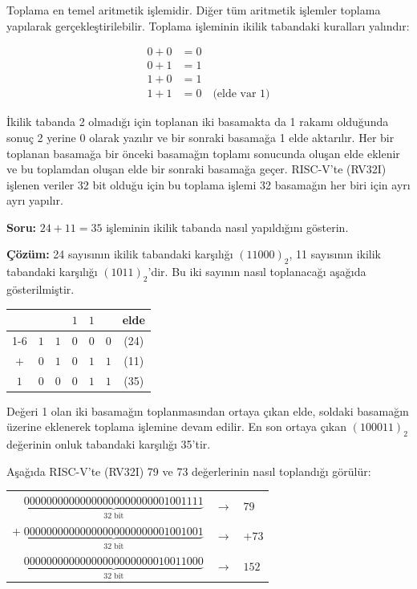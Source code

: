 Toplama en temel aritmetik işlemidir. Diğer tüm aritmetik işlemler toplama yapılarak gerçekleştirilebilir. Toplama işleminin ikilik tabandaki kuralları yalındır:

\begin{align*}
0 + 0 &= 0 \\
0 + 1 &= 1 \\
1 + 0 &= 1 \\
1 + 1 &= 0 \quad \text{(elde var 1)}
\end{align*}

İkilik tabanda 2 olmadığı için toplanan iki basamakta da 1 rakamı olduğunda sonuç 2 yerine 0 olarak yazılır ve bir sonraki basamağa 1 elde aktarılır. Her bir toplanan basamağa bir önceki basamağın toplamı sonucunda oluşan elde eklenir ve bu toplamdan oluşan elde bir sonraki basamağa geçer. RISC-V'te (RV32I) işlenen veriler 32 bit olduğu için bu toplama işlemi 32 basamağın her biri için ayrı ayrı yapılır.

\begin{ornek}[5.1]
\textbf{Soru:} $24 + 11 = 35$ işleminin ikilik tabanda nasıl yapıldığını gösterin.

\textbf{Çözüm:} 24 sayısının ikilik tabandaki karşılığı $(11000)_2$, 11 sayısının ikilik tabandaki karşılığı $(1011)_2$'dir. Bu iki sayının nasıl toplanacağı aşağıda gösterilmiştir.

\begin{center}
\begin{tabular}{c c c c c c c}
  & &   & $1$ & $1$ & & elde \\
\cline{1-6}
  & $1$ & $1$ & $0$ & $0$ & $0$ & (24) \\
$+$ & $0$ & $1$ & $0$ & $1$ & $1$ & (11) \\
\hline
$1$ & $0$ & $0$ & $0$ & $1$ & $1$ & (35) \\
\end{tabular}
\end{center}

Değeri 1 olan iki basamağın toplanmasından ortaya çıkan elde, soldaki basamağın üzerine eklenerek toplama işlemine devam edilir. En son ortaya çıkan $(100011)_2$ değerinin onluk tabandaki karşılığı 35'tir.
\end{ornek}

Aşağıda RISC-V'te (RV32I) 79 ve 73 değerlerinin nasıl toplandığı görülür:

\begin{center}
\small
\begin{tabular}{r c l}
$\underbrace{00000000000000000000000001001111}_{32 \text{ bit}}$ & $\rightarrow$ & $79$ \\
$+ \; \underbrace{00000000000000000000000001001001}_{32 \text{ bit}}$ & $\rightarrow$ & $+73$ \\
\hline
$\underbrace{00000000000000000000000010011000}_{32 \text{ bit}}$ & $\rightarrow$ & $152$ \\
\end{tabular}
\end{center}

